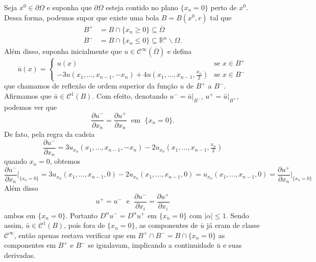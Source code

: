 \documentclass[a4paper, 11pt]{book}
\theoremstyle{definition}
\newcommand{\bR}{\mathbb{R}}
\newcommand{\cC}{\mathcal{C}}
\begin{document}
\begin{prf}
    Seja $x^0 \in \partial\Omega$ e suponha que $\partial\Omega$ esteja contido no plano $\{x_n = 0\}$ perto de $x^0$.
    Dessa forma, podemos supor que existe uma bola $B = B(x^0, r)$ tal que
    \[
        \begin{aligned}
            B^+ &= B \cap \{x_n \geqslant 0\} \subseteq \overline\Omega\\
            B^- &= B \cap \{x_n \leqslant 0\} \subseteq \bR^n \smallsetminus \Omega.
        \end{aligned}
    \]
    Além disso, suponha inicialmente que $u \in \cC^\infty(\overline\Omega)$ e defina
    \[
        \bar u(x) =
        \left\{ 
            \begin{array}{ll}
                u(x) & \text{se } x\in B^+\\
                -3u(x_1,\dots,x_{n-1}, -x_n) + 4u(x_1,\dots,x_{n-1},\frac{x_n}{2}) & \text{se } x \in B^-
            \end{array}
        \right.
    \]
    que chamamos de reflexão de ordem superior da função $u$ de $B^+$ a $B^-$.
    Afirmamos que $\bar u \in \cC^1(B)$.
    Com efeito, denotando $u^- = \bar u \big|_{B^-}$, $u^+ = \bar u \big|_{B^+}$, podemos ver que
    \[
        \dfrac{\partial u^-}{\partial x_n} = \dfrac{\partial u^+}{\partial x_n} \;\text{ em }\; \{x_n = 0\}.
    \]
    De fato, pela regra da cadeia
    \[
        \dfrac{\partial u^-}{\partial x_n} = 3 u_{x_n}(x_1,\dots,x_{n-1}, -x_n)  - 2u_{x_n}(x_1,\dots,x_{n-1},\tfrac{x_n}{2})
    \]
    quando $x_n = 0$, obtemos
    \[
        \dfrac{\partial u^-}{\partial x_n} \Bigg|_{\{x_n = 0\}} = 3u_{x_n}(x_1,\dots,x_{n-1},0) - 2u_{x_n}(x_1,\dots,x_{n-1},0) = u_{x_n}(x_1,\dots,x_{n-1},0) = \dfrac{\partial u^+}{\partial x_n} \Bigg|_{\{x_n =0\}}
    \]
    Além disso
    \[
        u^+ = u^- \;\text{ e }\; \dfrac{\partial u^-}{\partial x_i} = \dfrac{\partial u^+}{\partial x_i}
    \]
    ambos em $\{x_n = 0\}$.
    Portanto $D^\alpha u^- = D^\alpha u^+$ em $\{x_n = 0\}$ com $|\alpha| \leqslant 1$. Sendo assim, $\bar u \in \cC^1 (B)$, pois fora de $\{x_n = 0\}$, as componentes de $\bar u$ já eram de classe $\cC^\infty$, então apenas restava verificar que em $B^+ \cap B^- = B \cap \{x_n = 0\}$ as componentes em $B^+$ e $B^-$ se igualavam, implicando a continuidade $\bar u$ e suas derivadas.


\end{prf}
\end{document}
